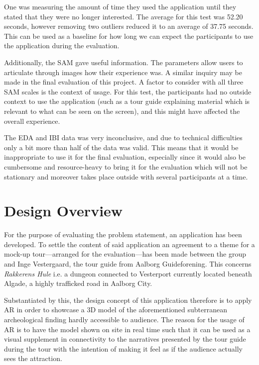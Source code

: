 One was measuring the amount of time they used the application until they stated that they were no longer interested. The average for this test was 52.20 seconds, however removing two outliers reduced it to an average of 37.75 seconds. This can be used as a baseline for how long we can expect the participants to use the application during the evaluation.

Additionally, the SAM gave useful information. The parameters allow users to articulate through images how their experience was. A similar inquiry may be made in the final evaluation of this project. A factor to consider with all three SAM scales is the context of usage. For this test, the participants had no outside context to use the application (such as a tour guide explaining material which is relevant to what can be seen on the screen), and this might have affected the overall experience.

The EDA and IBI data was very inconclusive, and due to technical difficulties only a bit more than half of the data was valid. This means that it would be inappropriate to use it for the final evaluation, especially since it would also be cumbersome and resource-heavy to bring it for the evaluation which will not be stationary and moreover takes place outside with several participants at a time.\pagebreak

\section{Design Overview}\label{sec:design}
For the purpose of evaluating the problem statement, an application has been developed. To settle the content of said application an agreement to a theme for a mock-up tour---arranged for the evaluation---has been made between the group and Inge Vestergaard, the tour guide from Aalborg Guideforening. This concerns \textit{Rakkerens Hule} i.e. a dungeon connected to Vesterport currently located beneath Algade, a highly trafficked road in Aalborg City. 

Substantiated by this, the design concept of this application therefore is to apply AR in order to showcase a 3D model of the aforementioned subterranean archeological finding hardly accessible to audience. The reason for the usage of AR is to have the model shown on site in real time such that it can be used as a visual supplement in connectivity to the narratives presented by the tour guide during the tour with the intention of making it feel as if the audience actually sees the attraction.

